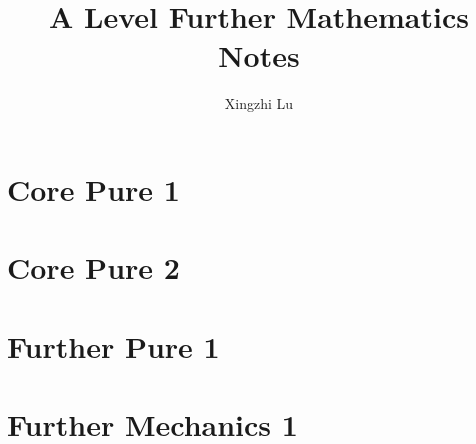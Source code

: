 \documentclass[oneside,fleqn,11pt]{book}
\title{A Level Further Mathematics Notes}
\author{Xingzhi Lu}
\date{}
\begin{document}
\everymath{\displaystyle}
\maketitle
\tableofcontents

\part{Core Pure 1}


\part{Core Pure 2}
\setcounter{chapter}{0}


\part{Further Pure 1}
\setcounter{chapter}{0}


\part{Further Mechanics 1}
\setcounter{chapter}{0}

\end{document}
